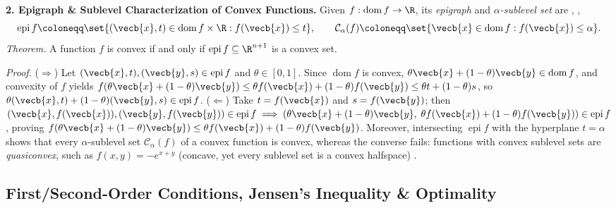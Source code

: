 \documentclass[../../../../master.tex]{subfiles}
\begin{document}
\begin{coremath}
\textbf{2. Epigraph \& Sublevel Characterization of Convex Functions.} Given $f : \operatorname{dom} f \to \R$, its \emph{epigraph} and \emph{$\alpha$-sublevel set} are , , 
\begin{equation}
  \operatorname{epi} f \coloneqq \set{(\vecb{x}, t) \in \operatorname{dom} f \times \R : f(\vecb{x}) \le t}, \qquad
  \mathcal{C}_\alpha(f) \coloneqq \set{\vecb{x} \in \operatorname{dom} f : f(\vecb{x}) \le \alpha}.
  \label{eq:convex:epigraph_sublevel}
\end{equation}
\emph{Theorem.} A function $f$ is convex if and only if $\operatorname{epi} f \subseteq \R^{n+1}$ is a convex set.

\emph{Proof.} ($\Rightarrow$) Let $(\vecb{x}, t), (\vecb{y}, s) \in \operatorname{epi} f$ and $\theta \in [0, 1]$. Since $\operatorname{dom} f$ is convex, $\theta\vecb{x} + (1-\theta)\vecb{y} \in \operatorname{dom} f$, and convexity of $f$ yields $f(\theta\vecb{x} + (1-\theta)\vecb{y}) \le \theta f(\vecb{x}) + (1-\theta)f(\vecb{y}) \le \theta t + (1-\theta)s$, so $\theta(\vecb{x}, t) + (1-\theta)(\vecb{y}, s) \in \operatorname{epi} f$. ($\Leftarrow$) Take $t = f(\vecb{x})$ and $s = f(\vecb{y})$; then $(\vecb{x}, f(\vecb{x})), (\vecb{y}, f(\vecb{y})) \in \operatorname{epi} f \implies (\theta\vecb{x} + (1-\theta)\vecb{y},\; \theta f(\vecb{x}) + (1-\theta)f(\vecb{y})) \in \operatorname{epi} f$, proving $f(\theta\vecb{x} + (1-\theta)\vecb{y}) \le \theta f(\vecb{x}) + (1-\theta)f(\vecb{y})$. Moreover, intersecting $\operatorname{epi} f$ with the hyperplane $t = \alpha$ shows that every $\alpha$-sublevel set $\mathcal{C}_\alpha(f)$ of a convex function is convex, whereas the converse fails: functions with convex sublevel sets are \emph{quasiconvex}, such as $f(x, y) = -e^{x+y}$ (concave, yet every sublevel set is a convex halfspace) .
\end{coremath}

\subsection{First/Second-Order Conditions, Jensen's Inequality \& Optimality}
\end{document}
